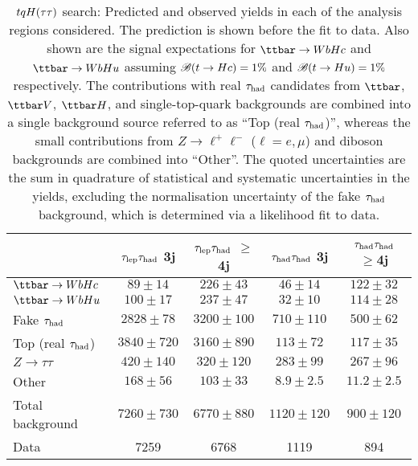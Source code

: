 \begin{table}[htbp]
\small
\begin{center}
\begin{tabular}{l*{4}{c}}
\hline\hline
 & $\tau_{\mathrm{lep}} \tau_{\mathrm{had}}$ 3j & $\tau_{\mathrm{lep}} \tau_{\mathrm{had}}$ $\geq$4j & $\tau_{\mathrm{had}} \tau_{\mathrm{had}}$ 3j &  $\tau_{\mathrm{had}} \tau_{\mathrm{had}}$ $\geq$4j \\
\hline
$\Hc$  &   $ 89 \pm 14 $ &   $ 226 \pm 43 $ &   $ 46 \pm 14 $ &   $ 122 \pm 32 $ \\ 
$\Hu$  &   $ 100 \pm 17 $ &   $ 237 \pm 47 $ &   $ 32 \pm 10 $ &   $ 114 \pm 28 $ \\ 
\hline
Fake $\tau_{\mathrm{had}}$  &   $ 2828 \pm 78 $ &   $ 3200 \pm 100 $ &   $ 710 \pm 110 $ &   $ 500 \pm 62 $ \\
Top (real $\tau_{\mathrm{had}}$)  &   $ 3840 \pm 720 $ &   $ 3160 \pm 890 $ &   $ 113 \pm 72 $ &   $ 117 \pm 35 $ \\  
$Z \to \tau\tau$  &   $ 420 \pm 140 $ &   $ 320 \pm 120 $ &   $ 283 \pm 99 $ &   $ 267 \pm 96 $ \\ 
Other  &   $ 168 \pm 56 $ &   $ 103 \pm 33 $ &   $ 8.9 \pm 2.5 $ &   $ 11.2 \pm 2.5 $ \\ 
\hline
Total background  &   $ 7260 \pm 730 $ &   $ 6770 \pm 880 $ &   $ 1120 \pm 120 $ &   $ 900 \pm 120 $ \\ 
\hline
Data  & 7259  & 6768  & 1119  & 894  \\
\hline\hline    
\end{tabular}

%
\end{center}
\caption{
$tqH(\tau\tau)$ search: Predicted and observed yields in each of the analysis regions considered.
The prediction is shown before the fit to data. Also shown are the signal expectations for 
$\Hc$ and $\Hu$ assuming $\mathscr{B}(t\to Hc)=1\%$ and $\mathscr{B}(t\to Hu)=1\%$ respectively.
The contributions with real $\tau_{\mathrm{had}}$ candidates from $\ttbar$,  $\ttbar V$, $\ttbar H$, and single-top-quark backgrounds are combined into
a single background source referred to as ``Top (real $\tau_{\mathrm{had}}$)'', whereas the small contributions from 
$Z\to \ell^+\ell^-$ ($\ell = e, \mu$) and diboson backgrounds are combined into ``Other''. 
The quoted uncertainties are the sum in quadrature of statistical and systematic uncertainties in the yields, 
excluding the normalisation uncertainty of the fake $\tau_{\mathrm{had}}$ background, which is determined via a likelihood fit to data.
}
\label{tab:Htautau_Prefit_Yields_Unblind}
\end{table} 


